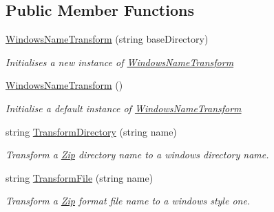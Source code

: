 \subsection*{Public Member Functions}
\begin{DoxyCompactItemize}
\item 
\hyperlink{class_i_c_sharp_code_1_1_sharp_zip_lib_1_1_zip_1_1_windows_name_transform_af3275a17cb67f312e51ef95f073d8f99}{Windows\+Name\+Transform} (string base\+Directory)
\begin{DoxyCompactList}\small\item\em Initialises a new instance of \hyperlink{class_i_c_sharp_code_1_1_sharp_zip_lib_1_1_zip_1_1_windows_name_transform}{Windows\+Name\+Transform} \end{DoxyCompactList}\item 
\hyperlink{class_i_c_sharp_code_1_1_sharp_zip_lib_1_1_zip_1_1_windows_name_transform_a92c2a46eef7241399d7c457abec87a9f}{Windows\+Name\+Transform} ()
\begin{DoxyCompactList}\small\item\em Initialise a default instance of \hyperlink{class_i_c_sharp_code_1_1_sharp_zip_lib_1_1_zip_1_1_windows_name_transform}{Windows\+Name\+Transform} \end{DoxyCompactList}\item 
string \hyperlink{class_i_c_sharp_code_1_1_sharp_zip_lib_1_1_zip_1_1_windows_name_transform_ac685f10a51ab041a6dd92da7729ff500}{Transform\+Directory} (string name)
\begin{DoxyCompactList}\small\item\em Transform a \hyperlink{namespace_i_c_sharp_code_1_1_sharp_zip_lib_1_1_zip}{Zip} directory name to a windows directory name. \end{DoxyCompactList}\item 
string \hyperlink{class_i_c_sharp_code_1_1_sharp_zip_lib_1_1_zip_1_1_windows_name_transform_aab54d8254c71fcc7b07551a60551e11a}{Transform\+File} (string name)
\begin{DoxyCompactList}\small\item\em Transform a \hyperlink{namespace_i_c_sharp_code_1_1_sharp_zip_lib_1_1_zip}{Zip} format file name to a windows style one. \end{DoxyCompactList}\end{DoxyCompactItemize}
